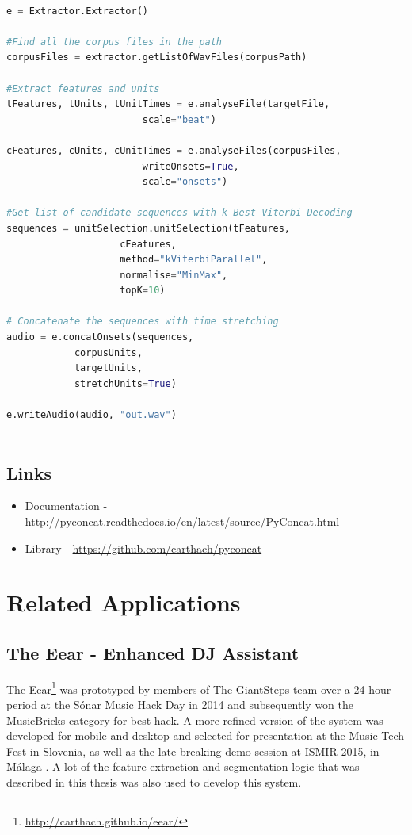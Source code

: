\small
\begin{lstlisting}[language=Python]

e = Extractor.Extractor()

#Find all the corpus files in the path
corpusFiles = extractor.getListOfWavFiles(corpusPath)

#Extract features and units
tFeatures, tUnits, tUnitTimes = e.analyseFile(targetFile, 
						scale="beat")
						
cFeatures, cUnits, cUnitTimes = e.analyseFiles(corpusFiles, 
						writeOnsets=True, 
						scale="onsets")

#Get list of candidate sequences with k-Best Viterbi Decoding 
sequences = unitSelection.unitSelection(tFeatures, 
					cFeatures, 
					method="kViterbiParallel", 
					normalise="MinMax", 
					topK=10)

# Concatenate the sequences with time stretching
audio = e.concatOnsets(sequences, 
			corpusUnits, 
			targetUnits, 
			stretchUnits=True)	
							   
e.writeAudio(audio, "out.wav")
 
\end{lstlisting}

\normalsize

\section{Links}

\begin{itemize}
  \item Documentation - \url{http://pyconcat.readthedocs.io/en/latest/source/PyConcat.html}
  \item Library - \url{https://github.com/carthach/pyconcat}
\end{itemize}






\chapter{Related Applications}
\label{app:related_applications}

\section{The Eear - Enhanced DJ Assistant}

The Eear\footnote{\url{http://carthach.github.io/eear/}} was prototyped by members of The GiantSteps team over a 24-hour period at the Sónar Music Hack Day in 2014 and subsequently won the MusicBricks category for best hack. A more refined version of the system was developed for mobile and desktop and selected for presentation at the Music Tech Fest in Slovenia, as well as the late breaking demo session at ISMIR 2015, in Málaga \citep{ONuanain2015}. A lot of the feature extraction and segmentation logic that was described in this thesis was also used to develop this system.

